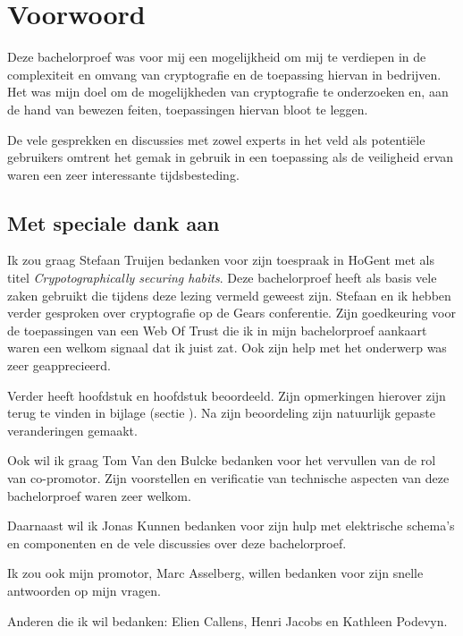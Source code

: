
\chapter*{Voorwoord}
\label{ch:voorwoord}


Deze bachelorproef was voor mij een mogelijkheid om mij te verdiepen in de
complexiteit en omvang van cryptografie en de toepassing hiervan in bedrijven.
Het was mijn doel om de mogelijkheden van cryptografie te onderzoeken en, aan de
hand van bewezen feiten, toepassingen hiervan bloot te leggen.

De vele gesprekken en discussies met zowel experts in het veld als potentiële
gebruikers omtrent het gemak in gebruik in een toepassing als de veiligheid
ervan waren een zeer interessante tijdsbesteding.

\section*{Met speciale dank aan}
Ik zou graag Stefaan Truijen bedanken voor zijn toespraak in HoGent met als
titel \textit{Crypotographically securing habits}. Deze bachelorproef heeft als
basis vele zaken gebruikt die tijdens deze lezing vermeld geweest zijn. Stefaan
en ik hebben verder gesproken over cryptografie op de Gears conferentie. Zijn
goedkeuring voor de toepassingen van een Web Of Trust die ik in mijn
bachelorproef aankaart waren een welkom signaal dat ik juist zat. Ook zijn help
met het onderwerp \textit{}  was
zeer geapprecieerd.

Verder heeft \textcite{TruijenStefaan} hoofdstuk
 en hoofdstuk
 beoordeeld. Zijn opmerkingen
hierover zijn terug te vinden in bijlage (sectie
). Na zijn beoordeling zijn
natuurlijk gepaste veranderingen gemaakt.

Ook wil ik graag Tom Van den Bulcke bedanken voor het vervullen van de rol van
co-promotor. Zijn voorstellen en verificatie van technische aspecten van deze
bachelorproef waren zeer welkom.

Daarnaast wil ik Jonas Kunnen bedanken voor zijn hulp met elektrische schema's
en componenten en de vele discussies over deze bachelorproef.

Ik zou ook mijn promotor, Marc Asselberg, willen bedanken voor zijn snelle
antwoorden op mijn vragen.

Anderen die ik wil bedanken: Elien Callens, Henri Jacobs en Kathleen Podevyn.
